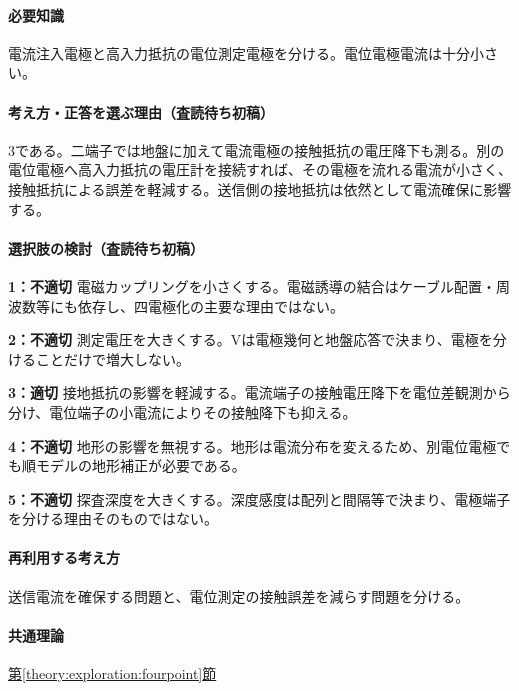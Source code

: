 \paragraph{必要知識} 電流注入電極と高入力抵抗の電位測定電極を分ける。電位電極電流は十分小さい。

\paragraph{考え方・正答を選ぶ理由（査読待ち初稿）} 3である。二端子では地盤に加えて電流電極の接触抵抗の電圧降下も測る。別の電位電極へ高入力抵抗の電圧計を接続すれば、その電極を流れる電流が小さく、接触抵抗による誤差を軽減する。送信側の接地抵抗は依然として電流確保に影響する。

\paragraph{選択肢の検討（査読待ち初稿）}\mbox{}\par

\noindent\textbf{1：不適切} 電磁カップリングを小さくする。電磁誘導の結合はケーブル配置・周波数等にも依存し、四電極化の主要な理由ではない。\par

\noindent\textbf{2：不適切} 測定電圧を大きくする。Vは電極幾何と地盤応答で決まり、電極を分けることだけで増大しない。\par

\noindent\textbf{3：適切} 接地抵抗の影響を軽減する。電流端子の接触電圧降下を電位差観測から分け、電位端子の小電流によりその接触降下も抑える。\par

\noindent\textbf{4：不適切} 地形の影響を無視する。地形は電流分布を変えるため、別電位電極でも順モデルの地形補正が必要である。\par

\noindent\textbf{5：不適切} 探査深度を大きくする。深度感度は配列と間隔等で決まり、電極端子を分ける理由そのものではない。\par

\paragraph{再利用する考え方} 送信電流を確保する問題と、電位測定の接触誤差を減らす問題を分ける。

\paragraph{共通理論} \hyperref[theory:exploration:fourpoint]{第\ref*{theory:exploration:fourpoint}節}

